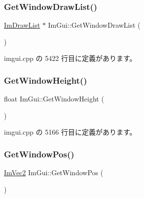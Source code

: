 \mbox{\label{namespace_im_gui_aa100c22a9feafe843fa12c66590cbda0}} 
\subsubsection{\texorpdfstring{Get\+Window\+Draw\+List()}{GetWindowDrawList()}}
{\footnotesize\ttfamily \mbox{\hyperlink{struct_im_draw_list}{Im\+Draw\+List}} $\ast$ Im\+Gui\+::\+Get\+Window\+Draw\+List (\begin{DoxyParamCaption}{ }\end{DoxyParamCaption})}



 imgui.\+cpp の 5422 行目に定義があります。

\mbox{\label{namespace_im_gui_a44d2bfb80e0d2dd232a553ab29a91b52}} 
\subsubsection{\texorpdfstring{Get\+Window\+Height()}{GetWindowHeight()}}
{\footnotesize\ttfamily float Im\+Gui\+::\+Get\+Window\+Height (\begin{DoxyParamCaption}{ }\end{DoxyParamCaption})}



 imgui.\+cpp の 5166 行目に定義があります。

\mbox{\label{namespace_im_gui_a413d939f3ef416a47d6e5b48be955146}} 
\subsubsection{\texorpdfstring{Get\+Window\+Pos()}{GetWindowPos()}}
{\footnotesize\ttfamily \mbox{\hyperlink{struct_im_vec2}{Im\+Vec2}} Im\+Gui\+::\+Get\+Window\+Pos (\begin{DoxyParamCaption}{ }\end{DoxyParamCaption})}



